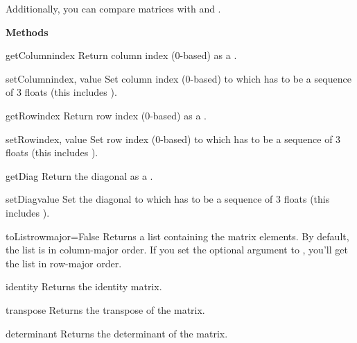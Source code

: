 Additionally, you can compare matrices with \code{==} and \code{!=}.

{\bf Methods}

\begin{methoddesc}{getColumn}{index}
Return column index (0-based) as a .
\end{methoddesc}

\begin{methoddesc}{setColumn}{index, value}
Set column index (0-based) to  which has to be a sequence
of 3 floats (this includes ).
\end{methoddesc}

\begin{methoddesc}{getRow}{index}
Return row index (0-based) as a .
\end{methoddesc}

\begin{methoddesc}{setRow}{index, value}
Set row index (0-based) to  which has to be a sequence of
3 floats (this includes ).
\end{methoddesc}

\begin{methoddesc}{getDiag}{}
Return the diagonal as a .
\end{methoddesc}

\begin{methoddesc}{setDiag}{value}
Set the diagonal to  which has to be a sequence of
3 floats (this includes ).
\end{methoddesc}

\begin{methoddesc}{toList}{rowmajor=False}
Returns a list containing the matrix elements. By default, the list is
in column-major order. If you set the optional argument  to
, you'll get the list in row-major order.
\end{methoddesc}

\begin{methoddesc}{identity}{}
Returns the identity matrix. 
\end{methoddesc}

\begin{methoddesc}{transpose}{}
Returns the transpose of the matrix.
\end{methoddesc}

\begin{methoddesc}{determinant}{}
Returns the determinant of the matrix.
\end{methoddesc}

